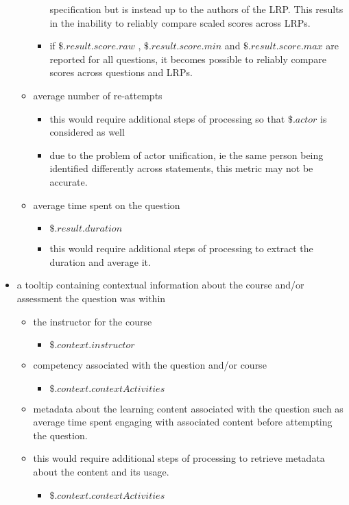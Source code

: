 \documentclass{article}
\begin{document}
\begin{itemize}
\begin{itemize}
\begin{itemize}
      specification but is instead up to the authors of the LRP. This
      results in the inability to reliably compare scaled scores across LRPs.
    \item if $\$.result.score.raw$ , $\$.result.score.min$ and
      $\$.result.score.max$ are reported for all questions, it becomes
      possible to reliably compare scores across questions and LRPs.
    \end{itemize}
  \item average number of re-attempts
    \begin{itemize}
    \item this would require additional steps of processing so that
      $\$.actor$ is considered as well
    \item due to the problem of actor unification, ie the same
      person being identified differently across statements, this
      metric may not be accurate.
    \end{itemize}
  \item average time spent on the question
    \begin{itemize}
    \item $\$.result.duration$
    \item this would require additional steps of processing to
      extract the duration and average it.
    \end{itemize}
  \end{itemize}
\item a tooltip containing contextual information about the course
  and/or assessment the question was within
  \begin{itemize}
  \item the instructor for the course
    \begin{itemize}
    \item $\$.context.instructor$
    \end{itemize}
  \item competency associated with the question and/or course
    \begin{itemize}
    \item $\$.context.contextActivities$
    \end{itemize}
  \item metadata about the learning content associated with the
    question such as average time spent engaging with associated
    content before attempting the question.
  \item this would require additional steps of processing to
    retrieve metadata about the content and its usage.
    \begin{itemize}
    \item $\$.context.contextActivities$
    \end{itemize}
  \end{itemize}
\end{itemize}
\end{document}
